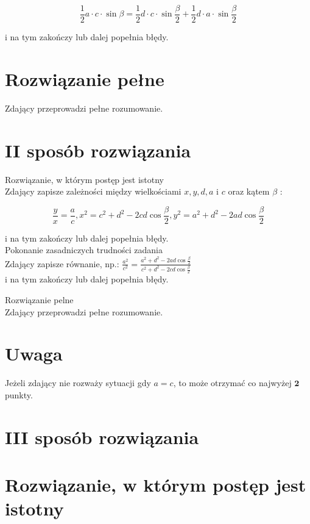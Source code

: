 \documentclass[10pt]{article}
\begin{document}
$$
\frac{1}{2} a \cdot c \cdot \sin \beta=\frac{1}{2} d \cdot c \cdot \sin \frac{\beta}{2}+\frac{1}{2} d \cdot a \cdot \sin \frac{\beta}{2}
$$

i na tym zakończy lub dalej popełnia błędy.

\section*{Rozwiązanie pełne}
Zdający przeprowadzi pełne rozumowanie.

\section*{II sposób rozwiązania}
Rozwiązanie, w którym postęp jest istotny\\
Zdający zapisze zależności między wielkościami $x, y, d, a$ i $c$ oraz kątem $\beta$ :

$$
\frac{y}{x}=\frac{a}{c}, x^{2}=c^{2}+d^{2}-2 c d \cos \frac{\beta}{2}, y^{2}=a^{2}+d^{2}-2 a d \cos \frac{\beta}{2}
$$

i na tym zakończy lub dalej popełnia błędy.\\
Pokonanie zasadniczych trudności zadania\\
Zdający zapisze równanie, np.: $\frac{a^{2}}{c^{2}}=\frac{a^{2}+d^{2}-2 a d \cos \frac{\beta}{2}}{c^{2}+d^{2}-2 c d \cos \frac{\beta}{2}}$\\
i na tym zakończy lub dalej popełnia błędy.

Rozwiązanie pelne\\
Zdający przeprowadzi pełne rozumowanie.

\section*{Uwaga}
Jeżeli zdający nie rozważy sytuacji gdy $a=c$, to może otrzymać co najwyżej $\mathbf{2}$ punkty.

\section*{III sposób rozwiązania}
\section*{Rozwiązanie, w którym postęp jest istotny}
\end{document}

